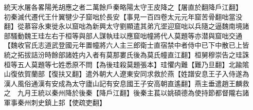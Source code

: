 統天水屠各畧陽羌胡應之者二萬餘戶秦略陽太守王皮降之【屠直於翻降戶江翻】　初秦滅代遷代王什翼犍少子窟咄於長安【事見一百四卷太元元年窟苦骨翻咄當没翻】從慕容永東徙永以窟咄為新興太守劉顯遣其弟亢埿迎窟咄以兵隨之逼魏南境諸部騷動魏王珪左右于桓等與部人謀執珪以應窟咄幢將代人莫題等亦潜與窟咄交通【魏收官氏志道武登國元年置幢將六人主三郎衛士直宿禁中者侍中已下中散已上皆統之拓拔詰汾時餘部諸姓内入者有莫那婁氏後為莫氏幢直江翻】桓舅穆崇告之珪誅桓等五人莫題等七姓悉原不問【為後珪殺莫題張本】珪懼内難【難乃旦翻】北踰隂山復依賀蘭部【復扶又翻】遣外朝大人遼東安同求救於燕【姓譜安息王子入侍遂為漢人風俗通漢有安成為太守廬山記有安息國王子安高朝直遙翻】燕主垂遣趙王麟救之　九月王統以秦州降於後秦【降戶江翻】後秦主萇以姚碩德為使持節都督隴右諸軍事秦州刺史鎮上邽【使疏吏翻】　